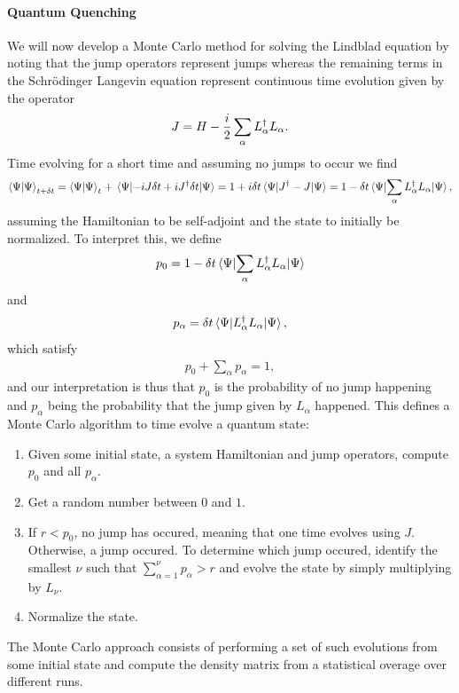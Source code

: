 \paragraph{Quantum Quenching}
We will now develop a Monte Carlo method for solving the Lindblad equation by noting that the jump operators represent jumps whereas the remaining terms in the Schrödinger Langevin equation represent continuous time evolution given by the operator
\begin{align*}
	J = H - \frac{i}{2}\sum\limits_{\alpha}L_{\alpha}^{\dagger} L_{\alpha}.
\end{align*}
Time evolving for a short time and assuming no jumps to occur we find
\begin{align*}
	\braket{\Psi}_{t + \delta t} = \braket{\Psi}_{t} + \expval{-iJ\delta t + iJ\ensuremath{^{\dagger}}\delta t}{\Psi} = 1 + i\delta t\expval{J\ensuremath{^{\dagger}}- J}{\Psi} = 1 - \delta t\expval{\sum\limits_{\alpha}L_{\alpha}\ensuremath{^{\dagger}}L_{\alpha}}{\Psi},
\end{align*}
assuming the Hamiltonian to be self-adjoint and the state to initially be normalized. To interpret this, we define
\begin{align*}
	p_{0} = 1 - \delta t\expval{\sum\limits_{\alpha}L_{\alpha}\ensuremath{^{\dagger}}L_{\alpha}}{\Psi}
\end{align*}
and
\begin{align*}
	p_{\alpha} = \delta t\expval{L_{\alpha}\ensuremath{^{\dagger}}L_{\alpha}}{\Psi},
\end{align*}
which satisfy
\begin{align*}
	p_{0} + \sum\limits_{\alpha}p_{\alpha} = 1,
\end{align*}
and our interpretation is thus that $p_{0}$ is the probability of no jump happening and $p_{\alpha}$ being the probability that the jump given by $L_{\alpha}$ happened. This defines a Monte Carlo algorithm to time evolve a quantum state:
\begin{enumerate}
	\item Given some initial state, a system Hamiltonian and jump operators, compute $p_{0}$ and all $p_{\alpha}$.
	\item Get a random number between $0$ and $1$.
	\item If $r < p_{0}$, no jump has occured, meaning that one time evolves using $J$. Otherwise, a jump occured. To determine which jump occured, identify the smallest $\nu$ such that $\sum\limits_{\alpha = 1}^{\nu}p_{\alpha}  > r$ and evolve the state by simply multiplying by $L_{\nu}$.
	\item Normalize the state.
\end{enumerate}
The Monte Carlo approach consists of performing a set of such evolutions from some initial state and compute the density matrix from a statistical overage over different runs.

